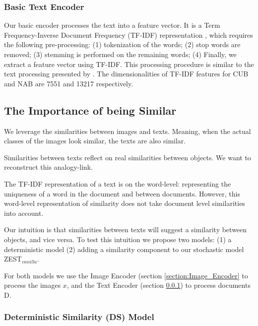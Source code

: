 \documentclass[11pt,a4paper]{article}
\begin{document}
\subsubsection{Basic Text Encoder}
\label{section:Text_Encoder}
Our basic encoder processes the text into a feature vector. It is a Term Frequency-Inverse Document Frequency (TF-IDF)  representation \citep{salton1988term}, which requires the following pre-processing: (1) tokenization of the words; (2) stop words are removed; (3) stemming is performed on the remaining words; (4) Finally, we extract a feature vector using TF-IDF. This processing procedure is similar to the text processing presented by \citet{zhu2018generative}.
The dimensionalities of TF-IDF features for
CUB and NAB are 7551 and 13217 respectively. 


\subsection{The Importance of being Similar}

We leverage the similarities between images and texts. Meaning, when the actual classes of the images look similar, the texts are also similar.

Similarities between texts reflect on real similarities between objects. We want to reconstruct this analogy-link.


The TF-IDF representation of a text is on the word-level: representing the uniqueness of a word in the document and between documents. However, this word-level representation of similarity does not take document level similarities into account. \par

\par

Our intuition is that similarities between texts will suggest a similarity between objects, and vice versa. To test this intuition we propose two models: (1) a deterministic model (2) adding a similarity component to our stochastic model ZEST$_{vanilla}$.

For both models we use the Image Encoder (section \ref{section:Image_Encoder} to process the images $x$, and the Text Encoder (section \ref{section:Text_Encoder}) to process documents D.

\subsubsection{Deterministic Similarity (DS) Model}
\end{document}
